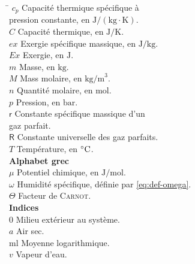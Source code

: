 \documentclass[a4paper,11pt]{scrartcl}
\begin{document}
\begin{multicols}{2}
	\begin{tabbing}
		\hspace{0.05\textwidth} \= \hspace{0.45\textwidth} \kill
		$c_p$ \> Capacité thermique spécifique à \\
		\> pression constante, en $\mathrm{J/(kg \cdot K)}$. \\
		$C$ \> Capacité thermique, en $\mathrm{J/K}$. \\
		$ex$ \> Exergie spécifique massique, en $\mathrm{J/kg}$. \\
		$Ex$ \> Exergie, en $\mathrm{J}$. \\
		$m$ \> Masse, en $\mathrm{kg}$. \\
		$M$ \> Mass molaire, en $\mathrm{kg/m}^3$. \\
		$n$ \> Quantité molaire, en $\mathrm{mol}$. \\
		$p$ \> Pression, en $\mathrm{bar}$. \\
		$\mathsf{r}$ \> Constante spécifique massique d'un \\
		\> gaz parfait. \\
		$\mathsf{R}$ \> Constante universelle des gaz parfaits. \\
		$T$ \> Température, en $\degree\mathrm{C}$. \\
		\> \textbf{Alphabet grec} \\
		$\mu$ \> Potentiel chimique, en $\mathrm{J/mol}$. \\
		$\omega$ \> Humidité spécifique, définie par
		\eqref{eq:def-omega}. \\
		$\Theta$ \> Facteur de \textsc{Carnot}. \\
		\> \textbf{Indices} \\
		$0$ \> Milieu extérieur au système. \\
		$a$ \> Air sec. \\
		ml \> Moyenne logarithmique. \\
		$v$ \> Vapeur d'eau. \\
	\end{tabbing}
\end{multicols}

\printbibliography
\end{document}
